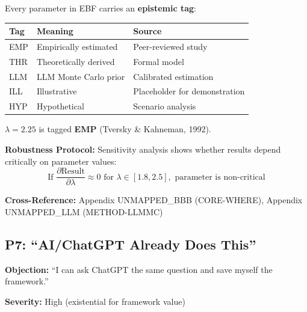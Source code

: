 \begin{axiom}
Every parameter in EBF carries an \textbf{epistemic tag}:

\begin{center}
\begin{tabular}{lll}
\textbf{Tag} & \textbf{Meaning} & \textbf{Source} \\
\midrule
EMP & Empirically estimated & Peer-reviewed study \\
THR & Theoretically derived & Formal model \\
LLM & LLM Monte Carlo prior & Calibrated estimation \\
ILL & Illustrative & Placeholder for demonstration \\
HYP & Hypothetical & Scenario analysis \\
\end{tabular}
\end{center}

$\lambda = 2.25$ is tagged \textbf{EMP} (Tversky \& Kahneman, 1992).

\textbf{Robustness Protocol:} Sensitivity analysis shows whether results
depend critically on parameter values:
\begin{equation}
\text{If } \frac{\partial \text{Result}}{\partial \lambda} \approx 0 \text{ for } \lambda \in [1.8, 2.5], \text{ parameter is non-critical}
\end{equation}
\end{axiom}

\textbf{Cross-Reference:} Appendix UNMAPPED_BBB (CORE-WHERE), Appendix UNMAPPED_LLM (METHOD-LLMMC)

\subsection{P7: ``AI/ChatGPT Already Does This''}
\label{sec:da-p7}

\begin{tcolorbox}[colback=gray!5!white, colframe=gray!75!black]
\textbf{Objection:} ``I can ask ChatGPT the same question and save myself the framework.''

\textbf{Severity:} High (existential for framework value)
\end{tcolorbox}

